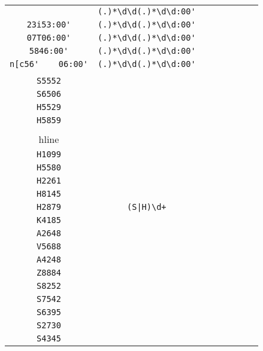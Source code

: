 \begin{longtable}{cccccccc}
\begin{tabular}{ll}
    \verb|u[73b888:00'| & \verb|(.)*\d\d(.)*\d\d:00'|\\
\verb|23i53:00'| & \verb|(.)*\d\d(.)*\d\d:00'|\\
\verb|07T06:00'| & \verb|(.)*\d\d(.)*\d\d:00'|\\
\verb|5846:00'| & \verb|(.)*\d\d(.)*\d\d:00'|\\
\verb|n[c56'	06:00'| & \verb|(.)*\d\d(.)*\d\d:00'|
\end{tabular}
\\\midrule 
\begin{tabular}{l}
    \verb|S5795|\\
\verb|S5552|\\
\verb|S6506|\\
\verb|H5529|\\
\verb|H5859|\\
\\hline\\
\verb|H1099|\\
\verb|H5580|\\
\verb|H2261|\\
\verb|H8145|\\
\verb|H2879|
\end{tabular}

&
\verb.(S|H)\d+.
&

\begin{tabular}{l}
    \verb|\u\d\d\d\d|\\
\verb|K4185|\\
\verb|A2648|\\
\verb|V5688|\\
\verb|A4248|\\
\verb|Z8884|
\end{tabular}

&

\begin{tabular}{l}
    \verb.((\u)*(\d)*)|(S)\d\d\d\d.\\
\verb|S8252|\\
\verb|S7542|\\
\verb|S6395|\\
\verb|S2730|\\
\verb|S4345|
\end{tabular}

&


\end{longtable}
